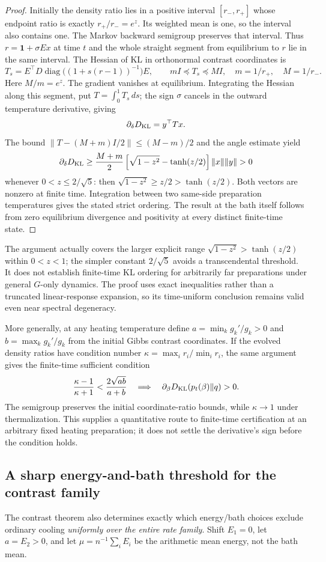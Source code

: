 \documentclass[11pt]{article}
\begin{document}
\begin{proof}
Initially the density ratio lies in a positive interval $[r_-,r_+]$
whose endpoint ratio is exactly $r_+/r_-=e^z$. Its weighted mean is one,
so the interval also contains one. The Markov backward semigroup
preserves that interval. Thus $r=\mathbf1+\sigma Ex$ at time $t$ and
the whole straight segment from equilibrium to $r$ lie in the same
interval. The Hessian of KL in orthonormal contrast coordinates is
\[
T_s=E^\top D\operatorname{diag}\bigl((1+s(r-1))^{-1}\bigr)E,
\qquad mI\preceq T_s\preceq MI,
\quad m=1/r_+,\quad M=1/r_-.
\]
Here $M/m=e^z$. The gradient vanishes at equilibrium. Integrating the
Hessian along this segment, put $T=\int_0^1T_s\,ds$; the sign $\sigma$
cancels in the outward temperature derivative, giving
\[
\partial_\delta D_{\rm KL}=y^\top T x.
\]
The bound $\|T-(M+m)I/2\|\leq(M-m)/2$ and the angle estimate yield
\[
\partial_\delta D_{\rm KL}
\geq\frac{M+m}{2}
 \left[\sqrt{1-z^2}-\tanh(z/2)\right]\|x\|\|y\|>0
\]
whenever $0<z\leq2/\sqrt5$: then
$\sqrt{1-z^2}\geq z/2>\tanh(z/2)$.
Both vectors are nonzero at finite time. Integration between two
same-side preparation temperatures gives the stated strict ordering.
The result at the bath itself follows from zero equilibrium divergence
and positivity at every distinct finite-time state.
\end{proof}

The argument actually covers the larger explicit range
$\sqrt{1-z^2}>\tanh(z/2)$ within $0<z<1$; the simpler constant
$2/\sqrt5$ avoids a transcendental threshold. It does not establish
finite-time KL ordering for arbitrarily far preparations under general
$G$-only dynamics. The proof uses exact inequalities rather than a
truncated linear-response expansion, so its time-uniform conclusion
remains valid even near spectral degeneracy.

More generally, at any heating temperature define
$a=\min_k g_k'/g_k>0$ and $b=\max_k g_k'/g_k$ from the initial Gibbs
contrast coordinates. If the evolved density ratios have condition
number $\kappa=\max_i r_i/\min_i r_i$, the same argument gives the
finite-time sufficient condition
\[
\frac{\kappa-1}{\kappa+1}<\frac{2\sqrt{ab}}{a+b}
\quad\Longrightarrow\quad
\partial_\beta D_{\rm KL}(p_t(\beta)\Vert q)>0.
\]
The semigroup preserves the initial coordinate-ratio bounds, while
$\kappa\to1$ under thermalization. This supplies a quantitative route
to finite-time certification at an arbitrary fixed heating preparation;
it does not settle the derivative's sign before the condition holds.

\subsection{A sharp energy-and-bath threshold for the contrast family}\label{sec:energythreshold}
The contrast theorem also determines exactly which energy/bath choices
exclude ordinary cooling \emph{uniformly over the entire rate family}.
Shift $E_1=0$, let $a=E_2>0$, and let
$\mu=n^{-1}\sum_iE_i$ be the arithmetic mean energy, not the bath mean.
\end{document}
